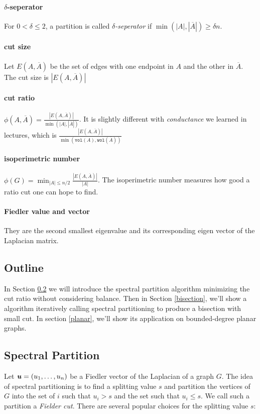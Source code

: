 \documentclass[11pt]{article}
\begin{document}
\paragraph{$\delta$-seperator} For $0 < \delta \leq 2$, a partition is called \textit{$\delta$-seperator} if $\min(|A|,|\overline{A}|) \geq \delta n$.

\paragraph{cut size} Let $E(A, \overline{A})$ be the set of edges with one endpoint in $A$ and the other in $\overline{A}$. The cut size is $|E(A, \overline{A})|$

\paragraph{cut ratio} $\phi(A,\overline{A})=\frac{|E(A, \overline{A})|}{\min(|A|, |\overline{A}|)}$. It is slightly different with \textit{conductance} we learned in lectures, which is  $\frac{|E(A, \overline{A})|}{\min\left(\texttt{vol}(A), \texttt{wol}(\overline{A})\right)}$

\paragraph{isoperimetric number}
$\phi(G) = \min_{|A| \leq n/2} \frac{|E(A, \overline{A})|}{|A|}$. The isoperimetric number measures how good a ratio cut one can hope to find.

\paragraph{Fiedler value and vector}
They are the second smallest eigenvalue and its corresponding eigen vector of the Laplacian matrix.

\subsection{Outline}
In Section \ref{sp} we will introduce the spectral partition algorithm minimizing the cut ratio without considering balance. Then in Section \ref{bisection}, we'll show a algorithm iteratively calling spectral partitioning to produce a bisection with small cut. In section \ref{planar}, we'll show its application on bounded-degree planar graphs.

\subsection{Spectral Partition}\label{sp}
Let $\boldsymbol{\mathit{u}} = (u_1, \dots, u_n)$ be a Fiedler vector of the Laplacian of a graph $G$. The idea of spectral partitioning is to find a splitting value $s$ and partition the vertices of $G$ into the set of $i$ such that $u_i > s$ and the set such that $u_i \leq s$. We call such a partition a \textit{Fielder cut}. There are several popular choices for the splitting value $s$:
\end{document}
